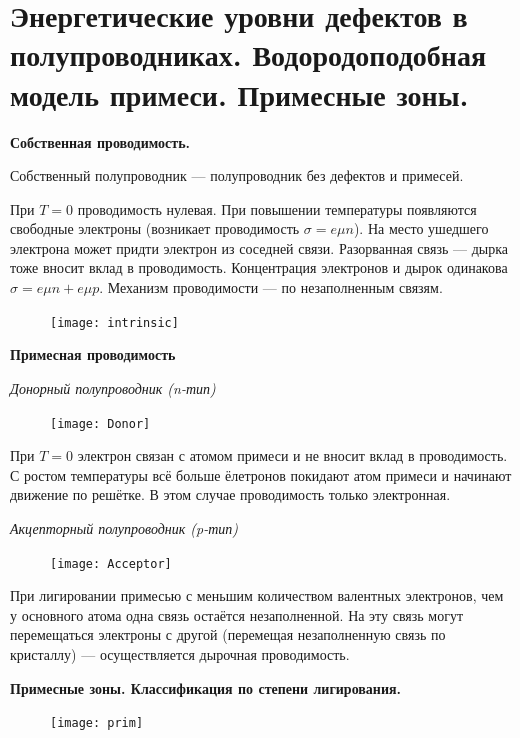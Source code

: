 \section{Энергетические уровни дефектов в полупроводниках. Водородоподобная модель примеси. Примесные зоны.}

\textbf{Собственная проводимость.}

Собственный полупроводник --- полупроводник без дефектов и примесей.

При $T=0$ проводимость нулевая. При повышении температуры появляются свободные электроны (возникает проводимость $\sigma = e \mu n$). На место ушедшего электрона может придти электрон из соседней связи. Разорванная связь --- дырка тоже вносит вклад в проводимость. Концентрация электронов и дырок одинакова $\sigma = e \mu n + e \mu p$. Механизм проводимости --- по незаполненным связям.

\begin{figure}[h!]
    \centering
    \texttt{[image: intrinsic]}
\end{figure}

\textbf{Примесная проводимость}

\textit{Донорный полупроводник (n-тип)}

\begin{figure}[h!]
    \centering
    \texttt{[image: Donor]}
\end{figure}

При $T=0$ электрон связан с атомом примеси и не вносит вклад в проводимость. С ростом температуры всё больше ёлетронов покидают атом примеси и начинают движение по решётке. В этом случае проводимость только электронная.

\textit{Акцепторный полупроводник (p-тип)}

\begin{figure}[h!]
    \centering
    \texttt{[image: Acceptor]}
\end{figure}

При лигировании примесью с меньшим количеством валентных электронов, чем у основного атома одна связь остаётся незаполненной. На эту связь могут перемещаться электроны с другой (перемещая незаполненную связь по кристаллу) --- осуществляется дырочная проводимость.

\textbf{Примесные зоны. Классификация по степени лигирования.}

\begin{figure}[h!]
    \centering
    \texttt{[image: prim]}
\end{figure}

